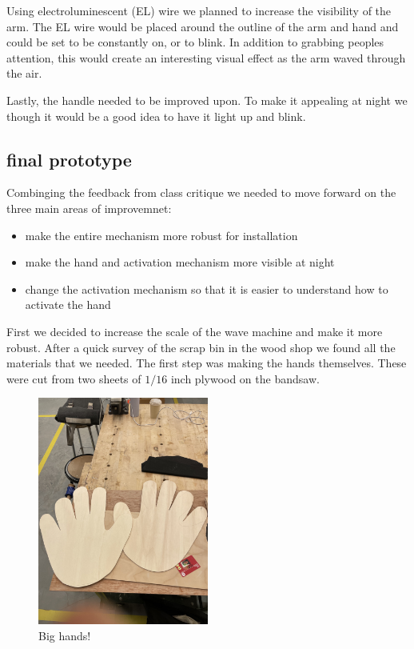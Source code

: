 \documentclass[11pt]{report}
\begin{document}
Using electroluminescent (EL) wire we planned to increase the visibility of the arm. The EL wire would be placed around the outline of the arm and hand and could be set to be constantly on, or to blink. In addition to grabbing peoples attention, this would create an interesting visual effect as the arm waved through the air.

Lastly, the handle needed to be improved upon. To make it appealing at night we though it would be a good idea to have it light up and blink.

\clearpage
\subsection*{final prototype}

Combinging the feedback from class critique we needed to move forward on the three main areas of improvemnet:
\begin{itemize}
\item
  make the entire mechanism more robust for installation
\item
  make the hand and activation mechanism more visible at night
\item
  change the activation mechanism so that it is easier to understand how to activate the hand
\end{itemize}

First we decided to increase the scale of the wave machine and make it more robust. After a quick survey of the scrap bin in the wood shop we found all the materials that we needed. The first step was making the hands themselves. These were cut from two sheets of $1/16$ inch plywood on the bandsaw. 

\begin{figure}[ht!]
\centering
\includegraphics[width=0.5\textwidth, angle=270]{"images/III/plainhands.jpg"}
\caption{Big hands!}
\end{figure}
\end{document}
